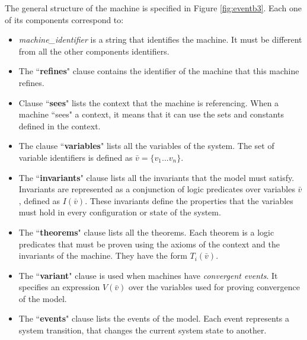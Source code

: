 The general structure of the machine is specified in Figure \ref{fig:eventb3}. Each one of its components correspond to:
\begin{itemize}
    \item \textit{machine\_identifier} is a string that identifies the machine. It must be different from all the other components identifiers.
    \item The ``\textbf{refines}" clause contains the identifier of the machine that this machine refines.
    \item Clause ``\textbf{sees}" lists the context that the machine is referencing. When a machine ``sees" a context, it means that it can use the sets and constants defined in the context.
    \item The clause ``\textbf{variables}" lists all the variables of the system. The set of variable identifiers is defined as $\bar{v} = \{v_1...v_n\}$.
    \item The ``\textbf{invariants}" clause lists all the invariants that the model must satisfy. Invariants are represented as a conjunction of logic predicates over variables $\bar{v}$, defined as $I(\bar{v})$. These invariants define the properties that the variables must hold in every configuration or state of the system.
    \item The ``\textbf{theorems}" clause lists all the theorems. Each theorem is a logic predicates that must be proven using the axioms of the context and the invariants of the machine. They have the form $T_i(\bar{v})$.
    \item The ``\textbf{variant}" clause is used when machines have \textit{convergent events}. It specifies an expression $V(\bar{v})$ over the variables used for proving convergence of the model.
    \item The ``\textbf{events}" clause lists the events of the model. Each event represents a system transition, that changes the current system state to another.
\end{itemize}
